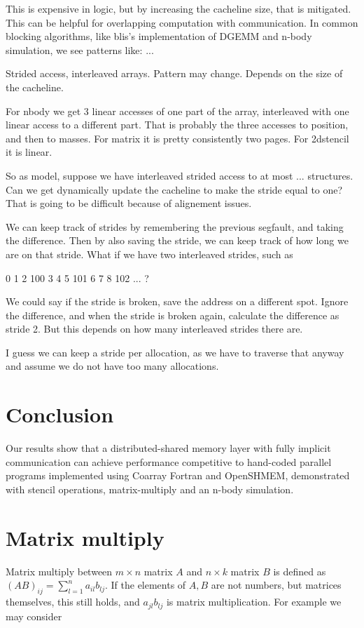 \documentclass{article}
\begin{document}
This is expensive in logic, but by increasing the cacheline size, that is mitigated. This can be 
helpful for overlapping computation with communication. In common blocking algorithms, like blis's implementation of DGEMM and n-body simulation, we see patterns like: ...

Strided access, interleaved arrays. Pattern may change. Depends on the size of the cacheline.

For nbody we get 3 linear accesses of one part of the array, interleaved with one linear access 
to a different part. That is probably the three accesses to position, and then to masses. For matrix it is pretty consistently two pages. For 2dstencil it is linear.

So as model, suppose we have interleaved strided access to at most ... structures. Can we get dynamically update the cacheline to make the stride equal to one? That is going to be difficult because of alignement issues.

We can keep track of strides by remembering the previous segfault, and taking the difference. Then by also saving the stride, we can keep track of how long we are on that stride. What if we have two interleaved strides, such as

0 1 2 100 3 4 5 101 6 7 8 102 ... ?

We could say if the stride is broken, save the address on a different spot. 
Ignore the difference, and when the stride is broken again, calculate the difference as stride 2.
But this depends on how many interleaved strides there are.

I guess we can keep a stride per allocation, as we have to traverse that anyway and assume we do not have too many allocations.


\section*{Conclusion}

Our results show that a distributed-shared memory layer with fully implicit communication can achieve
performance competitive to hand-coded parallel programs implemented using Coarray Fortran and 
OpenSHMEM, demonstrated with stencil operations, matrix-multiply and an n-body simulation.

\section{Matrix multiply}

Matrix multiply between $m \times n$ matrix $A$ and $n \times k$ matrix $B$ is defined as $(AB)_{ij} = \sum_{l = 1}^{n}a_{il} b_{lj}$. If the elements of $A, B$ are not numbers, but matrices themselves, this still holds, and $a_{jl} b_{lj}$ is matrix multiplication. For example we may consider
\end{document}

